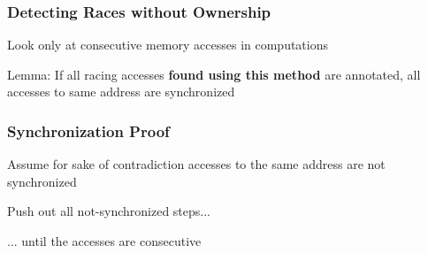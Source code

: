 \documentclass{beamer}
\begin{document}
\begin{frame}
\frametitle{Detecting Races without Ownership}
Look only at consecutive memory accesses in computations
\begin{center}
\end{center}

Lemma:
If all racing accesses \textbf{found using this method} are annotated, all accesses to same address are synchronized
\begin{center}
\end{center}
\end{frame} 



\begin{frame} 
\frametitle{Synchronization Proof}
Assume for sake of contradiction accesses to the same address are not synchronized
\begin{center}
\end{center}
Push out all not-synchronized steps...
\begin{center}
\end{center}
... until the accesses are consecutive
\begin{center}
\end{center}
\end{frame} 
\end{document}
